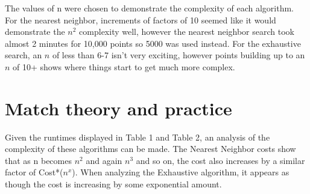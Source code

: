 \documentclass[11pt]{article}
\newcommand\tab[1][.5in]{\hspace*{#1}}
\begin{document}
\tab The values of n were chosen to demonstrate the complexity of each algorithm. For the nearest neighbor, increments of factors of 10 seemed like it would demonstrate the $n^2$ complexity well, however the nearest neighbor search took almost 2 minutes for 10,000 points so 5000 was used instead. For the exhaustive search, an $n$ of less than 6-7 isn't very exciting, however points building up to an $n$ of 10+ shows where things start to get much more complex. \\

\section{Match theory and practice}
\tab Given the runtimes displayed in Table 1 and Table 2, an analysis of the complexity of these algorithms can be made. The Nearest Neighbor costs show that as n becomes $n^2$ and again $n^3$ and so on, the cost also increases by a similar factor of Cost*($n^x$). When analyzing the Exhaustive algorithm, it appears as though the cost is increasing by some exponential amount. 
\end{document}
